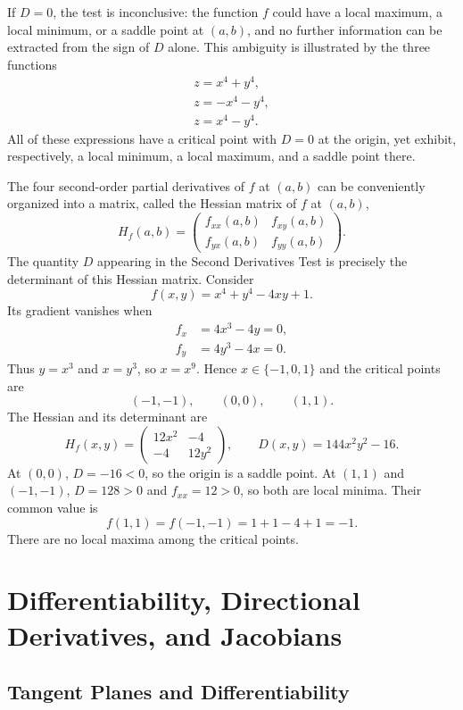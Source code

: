 \begin{remark}
If $D = 0$, the test is inconclusive: the function $f$ could have a local maximum, a local minimum, or a saddle point at $(a,b)$, and no further information can be extracted from the sign of $D$ alone. This ambiguity is illustrated by the three functions
\[
\begin{gathered}
z = x^4+y^4, \\[0.5em]
z = -x^4-y^4, \\[0.5em]
z = x^4-y^4.
\end{gathered}
\]
All of these expressions have a critical point with $D=0$ at the origin, yet exhibit, respectively, a local minimum, a local maximum, and a saddle point there.
\end{remark}

The four second-order partial derivatives of $f$ at $(a,b)$ can be conveniently organized into a matrix, called the Hessian matrix of $f$ at $(a,b)$,
\[
H_f(a,b) = \begin{pmatrix} f_{xx}(a,b) & f_{xy}(a,b) \\ f_{yx}(a,b) & f_{yy}(a,b) \end{pmatrix}.
\]
The quantity $D$ appearing in the Second Derivatives Test is precisely the determinant of this Hessian matrix. Consider
\[
f(x,y) = x^4+y^4-4xy+1.
\]
Its gradient vanishes when
\[
\begin{aligned}
f_x&=4x^3-4y=0,\\
f_y&=4y^3-4x=0.
\end{aligned}
\]
Thus $y=x^3$ and $x=y^3$, so $x=x^9$. Hence
$x\in\{-1,0,1\}$ and the critical points are
\[
(-1,-1),\qquad(0,0),\qquad(1,1).
\]
The Hessian and its determinant are
\[
H_f(x,y)=\begin{pmatrix}12x^2&-4\\-4&12y^2\end{pmatrix},
\qquad D(x,y)=144x^2y^2-16.
\]
At $(0,0)$, $D=-16<0$, so the origin is a saddle point. At
$(1,1)$ and $(-1,-1)$, $D=128>0$ and $f_{xx}=12>0$, so both are
local minima. Their common value is
\[
f(1,1)=f(-1,-1)=1+1-4+1=-1.
\]
There are no local maxima among the critical points.



\section{Differentiability, Directional Derivatives, and Jacobians}

\subsection{Tangent Planes and Differentiability}

